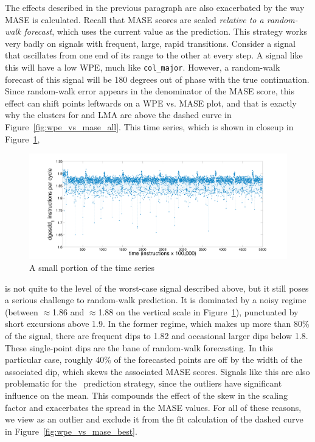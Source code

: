 The effects described in the previous paragraph are also exacerbated
by the way MASE is calculated.  Recall that MASE scores are scaled
\emph{relative to a random-walk forecast}, which uses the current
value as the prediction.  This strategy works very badly on signals
with frequent, large, rapid transitions.  Consider a signal that
oscillates from one end of its range to the other at every step.  A
signal like this will have a low WPE, much like {\tt col\_major}.
However, a random-walk forecast of this signal will be 180 degrees out
of phase with the true continuation.  Since random-walk error appears
in the denominator of the MASE score, this effect can shift points
leftwards on a WPE vs. MASE plot, and that is exactly why the \svdone
clusters for \arima and LMA are above the dashed curve in
Figure~\ref{fig:wpe_vs_mase_all}.  This time series, which is shown in
closeup in Figure~\ref{fig:svdone-ts},
\begin{figure}[htbp]
  \centering
    \includegraphics[width=\columnwidth]{figs/svdonets2}
\caption{A small portion of the \svdone time series}\label{fig:svdone-ts}
\end{figure}
is not quite to the level of the worst-case signal described above,
but it still poses a serious challenge to random-walk prediction.  It
is dominated by a noisy regime (between $\approx$1.86 and
$\approx$1.88 on the vertical scale in Figure~\ref{fig:svdone-ts}),
punctuated by short excursions above 1.9.  In the former regime, which
makes up more than 80\% of the signal, there are frequent dips to 1.82
and occasional larger dips below 1.8.  These single-point dips are the
bane of random-walk forecasting.  In this particular case, roughly
40\% of the forecasted points are off by the width of the associated
dip, which skews the associated MASE scores.  Signals like this are
also problematic for the \naive ~prediction strategy, since the
outliers have significant influence on the mean.  This compounds the
effect of the skew in the scaling factor and exacerbates the spread in
the \svdone MASE values.  For all of these reasons, we view \svdone as
an outlier and exclude it from the fit calculation of the dashed curve
in Figure~\ref{fig:wpe_vs_mase_best}.

